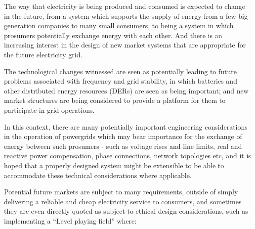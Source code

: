 






The way that electricity is being produced and consumed is expected to change in the future, from a system which supports the supply of energy from a few big generation companies to many small consumers, to being a system in which prosumers potentially exchange energy with each other.
And there is an increasing interest in the design of new market systems that are appropriate for the future electricity grid.

The technological changes witnessed are seen as potentially leading to future problems associated with frequency and grid stability, in which batteries and other distributed energy resources (DERs) are seen as being important; and new market structures are being considered to provide a platform for them to participate in grid operations.

In this context, there are many potentially important engineering considerations in the operation of powergrids which may bear importance for the exchange of energy between such prosumers - such as voltage rises and line limits, real and reactive power compensation, phase connections, network topologies etc, and it is hoped that a properly designed system might be extensible to be able to accommodate these technical considerations where applicable.

Potential future markets are subject to many requirements, outside of simply delivering a reliable and cheap electricity service to consumers, and sometimes they are even directly quoted as subject to ethical design considerations, such as implementing a ``Level playing field'' where:

